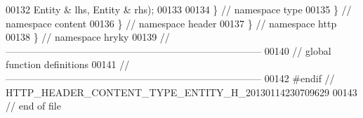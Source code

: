 \begin{DoxyCode}
00132         Entity & lhs, Entity & rhs);
00133 
00134 \} \textcolor{comment}{// namespace type}
00135 \} \textcolor{comment}{// namespace content}
00136 \} \textcolor{comment}{// namespace header}
00137 \} \textcolor{comment}{// namespace http}
00138 \} \textcolor{comment}{// namespace hryky}
00139 \textcolor{comment}{//
      ------------------------------------------------------------------------------}
00140 \textcolor{comment}{// global function definitions}
00141 \textcolor{comment}{//
      ------------------------------------------------------------------------------}
00142 \textcolor{preprocessor}{#endif // HTTP\_HEADER\_CONTENT\_TYPE\_ENTITY\_H\_20130114230709629}
00143 \textcolor{preprocessor}{}\textcolor{comment}{// end of file}
\end{DoxyCode}
